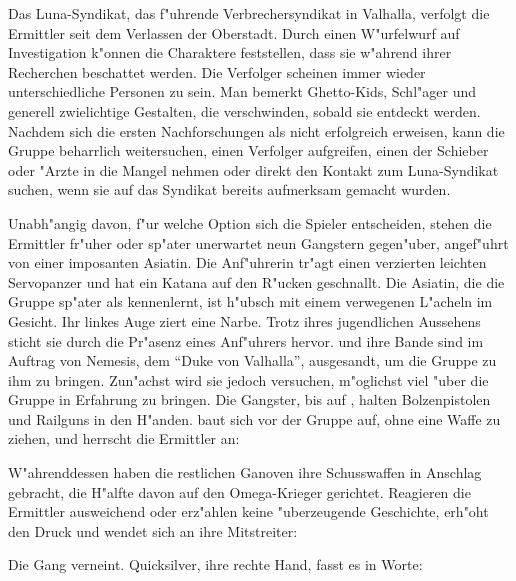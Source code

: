                                
Das Luna-Syndikat, das f"uhrende Verbrechersyndikat in Valhalla, verfolgt die Ermittler seit dem Verlassen der Oberstadt. Durch einen W"urfelwurf auf Investigation k"onnen die Charaktere feststellen, dass sie w"ahrend ihrer Recherchen beschattet werden. Die Verfolger scheinen immer wieder unterschiedliche Personen zu sein. Man bemerkt Ghetto-Kids, Schl"ager und generell zwielichtige Gestalten, die verschwinden, sobald sie entdeckt werden. Nachdem sich die ersten Nachforschungen als nicht erfolgreich erweisen, kann die Gruppe beharrlich weitersuchen, einen Verfolger aufgreifen, einen der Schieber oder "Arzte in die Mangel nehmen oder direkt den Kontakt zum Luna-Syndikat suchen, wenn sie auf das Syndikat bereits aufmerksam gemacht wurden.

Unabh"angig davon, f"ur welche Option sich die Spieler entscheiden, stehen die Ermittler fr"uher oder sp"ater unerwartet neun Gangstern gegen"uber, angef"uhrt von einer imposanten Asiatin. Die Anf"uhrerin tr"agt einen verzierten leichten Servopanzer und hat ein Katana auf den R"ucken geschnallt. Die Asiatin, die die Gruppe sp"ater als \xls{} kennenlernt, ist h"ubsch mit einem verwegenen L"acheln im Gesicht. Ihr linkes Auge ziert eine Narbe. Trotz ihres jugendlichen Aussehens sticht sie durch die Pr"asenz eines Anf"uhrers hervor. \xl{} und ihre Bande sind im Auftrag von Nemesis, dem ``Duke von Valhalla'', ausgesandt, um die Gruppe zu ihm zu bringen. Zun"achst wird sie jedoch versuchen, m"oglichst viel "uber die Gruppe in Erfahrung zu bringen. Die Gangster, bis auf \xl{}, halten Bolzenpistolen und Railguns in den H"anden. \xl{} baut sich vor der Gruppe auf, ohne eine Waffe zu ziehen, und herrscht die Ermittler an:


W"ahrenddessen haben die restlichen Ganoven ihre Schusswaffen in Anschlag gebracht, die H"alfte davon auf den Omega-Krieger gerichtet. Reagieren die Ermittler ausweichend oder erz"ahlen keine "uberzeugende Geschichte, erh"oht \xl{} den Druck und wendet sich an ihre Mitstreiter:


Die Gang verneint. Quicksilver, ihre rechte Hand, fasst es in Worte: 

